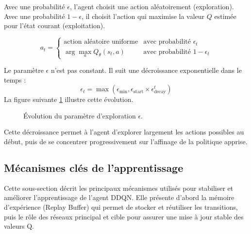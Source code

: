 Avec une probabilité $\epsilon$, l'agent choisit une action aléatoirement (exploration). Avec une probabilité $1-\epsilon$, il choisit l'action qui maximise la valeur $Q$ estimée pour l'état courant (exploitation).

\begin{equation}
	a_t =
	\begin{cases}
		\text{action aléatoire uniforme} & \text{avec probabilité } \epsilon_t \\
		\arg\max_{a} Q_\theta(s_t, a) & \text{avec probabilité } 1 - \epsilon_t
	\end{cases}
\end{equation}

Le paramètre $\epsilon$ n'est pas constant. Il suit une décroissance exponentielle dans le temps :
\begin{equation}
	\epsilon_t = \max(\epsilon_{\text{min}}, \epsilon_{\text{start}} \times \epsilon_{\text{decay}}^t)
\end{equation}
La figure suivante  \ref{fig:epsilon-decay-3000} illustre cette évolution.

\begin{figure}[H]
	\centering
	
	\caption{Évolution du paramètre d'exploration $\epsilon$.}
	\label{fig:epsilon-decay-3000}
\end{figure}

Cette décroissance permet à l'agent d'explorer largement les actions possibles au début, puis de se concentrer progressivement sur l'affinage de la politique apprise.

\subsection{Mécanismes clés de l'apprentissage}
\label{subsec:mecanismes-apprentissage}
Cette sous-section décrit les principaux mécanismes utilisés pour stabiliser et améliorer l’apprentissage de l’agent DDQN. Elle présente d’abord la mémoire d’expérience (Replay Buffer) qui permet de stocker et réutiliser les transitions, puis le rôle des réseaux principal et cible pour assurer une mise à jour stable des valeurs Q.

